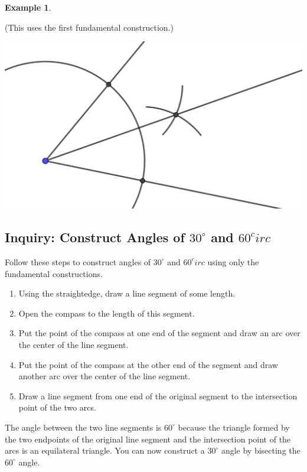 \documentclass[11pt]{article}
\newenvironment{task}
	{\begin{mdframed}[linecolor=lightgray, linewidth=3pt]\raggedright}
	{\end{mdframed}}
\theoremstyle{definition}
\newtheorem{example}[theorem]{Example}
\begin{document}
\begin{example}
\begin{enumerate}
    (This uses the first fundamental construction.)
  \begin{center}
    \includegraphics[scale=.75]{bisect_angle_4.png}
  \end{center}
  \end{enumerate}
\end{example}

\subsection{Inquiry: Construct Angles of $30^\circ$ and $60^circ$}
\begin{task}

Follow these steps to construct angles of $30^\circ$ and $60^circ$ using only the fundamental constructions.
\begin{enumerate}
  \item Using the straightedge, draw a line segment of some length.
  \item Open the compass to the length of this segment.
  \item Put the point of the compass at one end of the segment and draw an arc over the center of the line segment.
  \item Put the point of the compass at the other end of the segment and draw another arc over the center of the line segment.
  \item Draw a line segment from one end of the original segment to the intersection point of the two arcs.
\end{enumerate}

The angle between the two line segments is $60^\circ$ because the triangle formed by the two endpoints of the original line segment and the
intersection point of the arcs is an equilateral triangle. You can now construct a $30^\circ$ angle by bisecting the $60^\circ$ angle.
\end{task}
\end{document}
